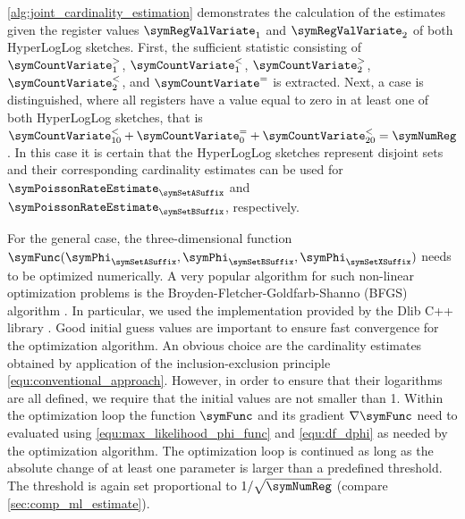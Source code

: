 \documentclass[a4paper]{scrartcl}
\begin{document}
\cref{alg:joint_cardinality_estimation} demonstrates the calculation of the estimates given the register values $\boldsymbol\symRegValVariate_{1}$ and 
$\boldsymbol\symRegValVariate_{2}$ of both HyperLogLog sketches. First, the sufficient statistic consisting of $\boldsymbol\symCountVariate^{>}_{1}$,
$\boldsymbol\symCountVariate^{<}_{1}$,
$\boldsymbol\symCountVariate^{>}_{2}$,
$\boldsymbol\symCountVariate^{<}_{2}$, and
$\boldsymbol\symCountVariate^{=}$ is extracted. Next, a case is distinguished, where
all registers have a value equal to zero in at least one of both HyperLogLog sketches, that is $\symCountVariate^{<}_{10}+\symCountVariate^{=}_0+\symCountVariate^{<}_{20} = \symNumReg$. In this case it is certain that the HyperLogLog sketches represent disjoint sets and their corresponding  cardinality estimates can be  used for $\symPoissonRateEstimate_{\symSetASuffix}$ and $\symPoissonRateEstimate_{\symSetBSuffix}$, respectively.

For the general case, the three-dimensional function $\symFunc(\symPhi_\symSetASuffix,\symPhi_\symSetBSuffix,\symPhi_\symSetXSuffix)$ needs to be optimized numerically. A very popular algorithm for such non-linear optimization problems is the Broyden-Fletcher-Goldfarb-Shanno (BFGS) algorithm \cite{Press2007}. In particular, we used the implementation provided by the Dlib C++ library \cite{King2009}. Good initial guess values are important to ensure fast convergence for the optimization algorithm. An obvious choice are the cardinality estimates obtained by application of the inclusion-exclusion principle \eqref{equ:conventional_approach}. However, in order to ensure that their logarithms are all defined, we require that the initial values are not smaller than 1. Within the optimization loop the function $\symFunc$ and its gradient $\nabla\symFunc$ need to evaluated using \eqref{equ:max_likelihood_phi_func} and \eqref{equ:df_dphi} as needed by the optimization algorithm. The optimization loop is continued as long as the absolute change of at least one parameter is larger than a predefined threshold. The threshold is again set proportional to $1/\sqrt{\symNumReg}$ (compare \cref{sec:comp_ml_estimate}).
\end{document}
